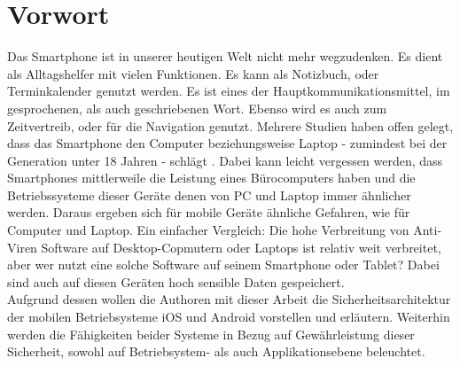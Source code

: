 \section{Vorwort}
	Das Smartphone ist in unserer heutigen Welt nicht mehr wegzudenken. Es dient
	als Alltagshelfer mit vielen Funktionen. Es kann als Notizbuch, oder
	Terminkalender genutzt werden. Es ist eines der Hauptkommunikationsmittel, im
	gesprochenen, als auch geschriebenen Wort. Ebenso wird es auch zum
	Zeitvertreib, oder für die Navigation genutzt. Mehrere Studien haben offen 
	gelegt, dass das Smartphone den Computer beziehungsweise Laptop - zumindest
	bei der Generation unter 18 Jahren - schlägt
	\cite{BitkomStudieJugend2014}
	\cite{MPFSStudie2013}.
	Dabei kann leicht vergessen werden, dass Smartphones mittlerweile die Leistung
	eines Bürocomputers haben und die Betriebssysteme dieser Geräte denen von PC
	und Laptop immer ähnlicher werden. Daraus ergeben sich für mobile Geräte
	ähnliche Gefahren, wie für Computer und Laptop. Ein einfacher Vergleich: Die
	hohe Verbreitung von Anti-Viren Software auf Desktop-Copmutern oder Laptops ist
	relativ weit verbreitet, aber wer nutzt eine solche Software auf
	seinem Smartphone oder Tablet? Dabei sind auch auf diesen Geräten hoch
	sensible Daten gespeichert.\\
	Aufgrund dessen wollen die Authoren mit dieser Arbeit die
	Sicherheitsarchitektur der mobilen Betriebsysteme iOS und Android vorstellen
	und erläutern. Weiterhin werden die Fähigkeiten beider Systeme in Bezug auf
	Gewährleistung dieser Sicherheit, sowohl auf Betriebsystem- als auch
	Applikationsebene beleuchtet.
